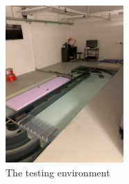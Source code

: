 \documentclass[11pt]{article}
\begin{document}
\begin{figure}
    \centering
    \includegraphics[width=0.4\textwidth]{figures/pool.jpg}
    \caption{The testing environment}
    \label{fig:basin}
\end{figure}
\end{document}

